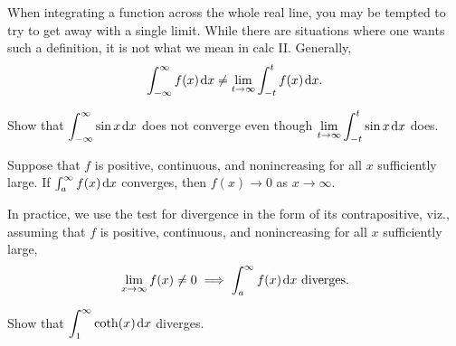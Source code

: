 \begin{remark}[Caution]
When integrating a function across the whole real line, you may be tempted to try to get away with a single limit.
While there are situations where one wants such a definition, it is not what we mean in calc II.
Generally,
\begin{equation*}
\int_{-\infty}^\infty f(x)\mkern 2mu \mathrm{d} x \ne \lim_{t\to\infty}\int_{-t}^t f(x)\mkern 2mu \mathrm{d} x.
\end{equation*}
\end{remark}

\begin{example}
Show that $\displaystyle\int_{-\infty}^\infty\sin x\mkern 2mu \mathrm{d} x$ does not converge even though $\displaystyle\lim_{t\to\infty}\int_{-t}^t\sin x\mkern 2mu \mathrm{d} x$ does.
\end{example}

\ifdefined\SOLUTION
{}
\fi

\vfill

\newpage

\begin{theorem}
Suppose that $f$ is positive, continuous, and nonincreasing for all $x$ sufficiently large.
If $\int_a^\infty f(x)\mkern 2mu \mathrm{d} x$ converges, then $f(x)\to 0$ as $x\to\infty$.
\end{theorem}
\begin{remark}
In practice, we use the test for divergence in the form of its contrapositive, viz.,
assuming that $f$ is positive, continuous, and nonincreasing for all $x$ sufficiently large,
\begin{equation*}
\lim_{x\to\infty} f(x)\ne 0 \implies \int_a^\infty f(x)\mkern 2mu \mathrm{d} x \text{ diverges}.
\end{equation*}
\end{remark}

\begin{example}
Show that $\displaystyle\int_1^\infty \coth(x)\mkern 2mu \mathrm{d} x$ diverges.
\end{example}

